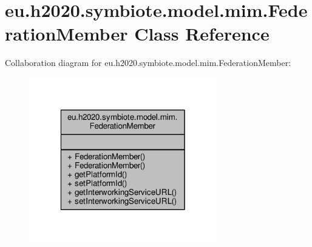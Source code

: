 \hypertarget{classeu_1_1h2020_1_1symbiote_1_1model_1_1mim_1_1FederationMember}{}\section{eu.\+h2020.\+symbiote.\+model.\+mim.\+Federation\+Member Class Reference}
\label{classeu_1_1h2020_1_1symbiote_1_1model_1_1mim_1_1FederationMember}


Collaboration diagram for eu.\+h2020.\+symbiote.\+model.\+mim.\+Federation\+Member\+:\nopagebreak
\begin{figure}[H]
\begin{center}
\leavevmode
\includegraphics[width=232pt]{classeu_1_1h2020_1_1symbiote_1_1model_1_1mim_1_1FederationMember__coll__graph}
\end{center}
\end{figure}
